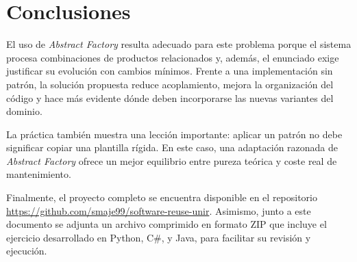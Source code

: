 \documentclass[12pt]{article}
\begin{document}
\section{Conclusiones}
El uso de \emph{Abstract Factory} resulta adecuado para este problema porque el sistema procesa combinaciones de productos relacionados y, además, el enunciado exige justificar su evolución con cambios mínimos. Frente a una implementación sin patrón, la solución propuesta reduce acoplamiento, mejora la organización del código y hace más evidente dónde deben incorporarse las nuevas variantes del dominio.

La práctica también muestra una lección importante: aplicar un patrón no debe significar copiar una plantilla rígida. En este caso, una adaptación razonada de \emph{Abstract Factory} ofrece un mejor equilibrio entre pureza teórica y coste real de mantenimiento.

Finalmente, el proyecto completo se encuentra disponible en el repositorio \url{https://github.com/smaje99/software-reuse-unir}. Asimismo, junto a este documento se adjunta un archivo comprimido en formato ZIP que incluye el ejercicio desarrollado en Python, C\#, y Java, para facilitar su revisión y ejecución.



\end{document}

